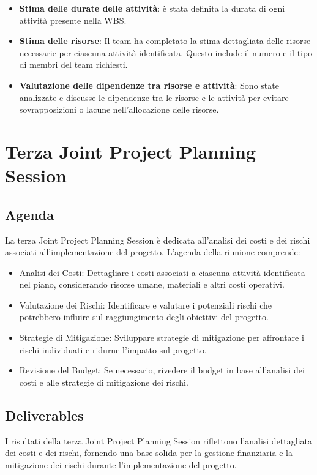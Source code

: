 \begin{itemize}
    \item \textbf{Stima delle durate delle attività}: è stata definita la durata di ogni attività presente nella WBS.
    \item \textbf{Stima delle risorse}: Il team ha completato la stima dettagliata delle risorse necessarie per ciascuna attività identificata. Questo include il numero e il tipo di membri del team richiesti.
    \item \textbf{Valutazione delle dipendenze tra risorse e attività}: Sono state analizzate e discusse le dipendenze tra le risorse e le attività per evitare sovrapposizioni o lacune nell'allocazione delle risorse.
\end{itemize}

\section{Terza Joint Project Planning Session}

\subsection{Agenda}

La terza Joint Project Planning Session è dedicata all'analisi dei costi e dei rischi associati all'implementazione del progetto. L'agenda della riunione comprende:

\begin{itemize}
    \item Analisi dei Costi: Dettagliare i costi associati a ciascuna attività identificata nel piano, considerando risorse umane, materiali e altri costi operativi.
    \item Valutazione dei Rischi: Identificare e valutare i potenziali rischi che potrebbero influire sul raggiungimento degli obiettivi del progetto.
    \item Strategie di Mitigazione: Sviluppare strategie di mitigazione per affrontare i rischi individuati e ridurne l'impatto sul progetto.
    \item Revisione del Budget: Se necessario, rivedere il budget in base all'analisi dei costi e alle strategie di mitigazione dei rischi.
\end{itemize}

\subsection{Deliverables}

I risultati della terza Joint Project Planning Session riflettono l'analisi dettagliata dei costi e dei rischi, fornendo una base solida per la gestione finanziaria e la mitigazione dei rischi durante l'implementazione del progetto.